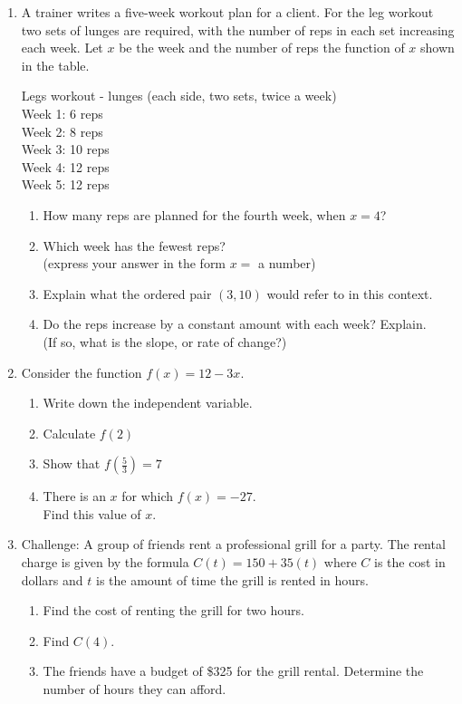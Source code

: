 \documentclass[12pt, twoside]{article}
\begin{document}
\begin{enumerate}
\newpage
\item A trainer writes a five-week workout plan for a client. For the leg workout two sets of lunges are required, with the number of reps in each set increasing each week. Let $x$ be the week and the number of reps the function of $x$ shown in the table.
  \begin{center}
      Legs workout - lunges (each side, two sets, twice a week)\\
        Week 1: 6 reps\\
        Week 2: 8 reps\\
        Week 3: 10 reps\\
        Week 4: 12 reps\\
        Week 5: 12 reps
    \end{center}
\begin{enumerate}[itemsep=0.25cm]
  \item How many reps are planned for the fourth week, when $x=4$?
  \item Which week has the fewest reps? \\(express your answer in the form $x=$ a number)
  \item Explain what the ordered pair $(3,10)$ would refer to in this context.\vspace{1cm}
  \item Do the reps increase by a constant amount with each week? Explain. \\(If so, what is the slope, or rate of change?) \vspace{1.5cm}
\end{enumerate}

\item Consider the function $f(x)=12-3x$.
\begin{enumerate}
  \item Write down the independent variable.
  \item Calculate $f(2)$ \vspace{2cm}
  \item Show that $\displaystyle f(\frac{5}{3})= 7$ \vspace{2cm}
  \item There is an $x$ for which $f(x)= -27$. \\ Find this value of $x$.
\end{enumerate} \vspace{2cm}

\newpage
\item Challenge: A group of friends rent a professional grill for a party. The rental charge is given by the formula $C(t) = 150 + 35(t)$ where $C$ is the cost in dollars and $t$ is the amount of time the grill is rented in hours.
\begin{enumerate}[itemsep=2cm]
  \item Find the cost of renting the grill for two hours.
  \item Find $C(4)$.
  \item The friends have a budget of \$325 for the grill rental. Determine the number of hours they can afford.
\end{enumerate} \vspace{3cm}


\end{enumerate}
\end{document}

